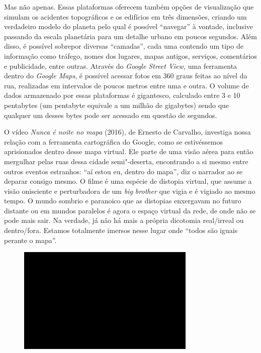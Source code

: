 Mas não apenas. Essas plataformas oferecem também opções de visualização
que simulam os acidentes topográficos e os edifícios em três dimensões,
criando um verdadeiro modelo do planeta pelo qual é possível ``navegar''
à vontade, inclusive passando da escala planetária para um detalhe
urbano em poucos segundos. Além disso, é possível sobrepor diversas
``camadas'', cada uma contendo um tipo de informação como tráfego, nomes
dos lugares, mapas antigos, serviços, comentários e publicidade, entre
outras. Através do \emph{Google Street View,} uma ferramenta dentro do
\emph{Google Maps}, é possível acessar fotos em 360 graus feitas ao
nível da rua, realizadas em intervalos de poucos metros entre uma e
outra. O volume de dados armazenado por essas plataformas é gigantesco,
calculado entre 3 e 10 pentabytes (um pentabyte equivale a um milhão de
gigabytes) sendo que qualquer um desses bytes pode ser acessado em
questão de segundos.

O vídeo \emph{Nunca é noite no mapa} (2016), de Ernesto de Carvalho,
investiga nossa relação com a ferramenta cartográfica do Google, como se
estivéssemos aprisionados dentro desse mapa virtual. Ele parte de uma
visão aérea para então mergulhar pelas ruas dessa cidade semi"-deserta,
encontrando a si mesmo entre outros eventos estranhos: ``aí estou eu,
dentro do mapa'', diz o narrador ao se deparar consigo mesmo. O filme é
uma espécie de distopia virtual, que assume a visão onisciente e
perturbadora de um \emph{big brother} que vigia e é vigiado ao mesmo
tempo. O mundo sombrio e paranoico que as distopias enxergavam no futuro
distante ou em mundos paralelos é agora o espaço virtual da rede, de
onde não se pode mais sair. Na verdade, já não há mais a própria
dicotomia real/irreal ou dentro/fora. Estamos totalmente imersos nesse
lugar onde ``todos são iguais perante o mapa''.

\begin{figure}[!ht]
\centering
 \includegraphics[width=85mm]{./imgs/im1.jpg}
\caption{\tiny{}}
\end{figure}

